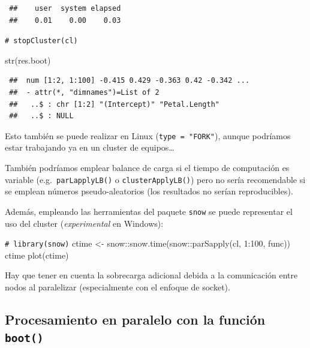 \documentclass[
]{book}
\newenvironment{Shaded}{\begin{snugshade}}{\end{snugshade}}
\newcommand{\CommentTok}[1]{\textcolor[rgb]{0.56,0.35,0.01}{\textit{#1}}}
\newcommand{\DecValTok}[1]{\textcolor[rgb]{0.00,0.00,0.81}{#1}}
\newcommand{\FunctionTok}[1]{\textcolor[rgb]{0.00,0.00,0.00}{#1}}
\newcommand{\NormalTok}[1]{#1}
\newcommand{\OtherTok}[1]{\textcolor[rgb]{0.56,0.35,0.01}{#1}}
\newcommand{\SpecialCharTok}[1]{\textcolor[rgb]{0.00,0.00,0.00}{#1}}
\theoremstyle{break}
\theoremstyle{nonumberplain}
\renewcommand{\CommentTok}[1]{\textcolor[rgb]{0.41,0.41,0.41}{\texttt{#1}}}
\begin{document}
\begin{verbatim}
 ##    user  system elapsed 
 ##    0.01    0.00    0.03
\end{verbatim}

\begin{Shaded}
\begin{Highlighting}[]
\CommentTok{\# stopCluster(cl)}

\FunctionTok{str}\NormalTok{(res.boot)}
\end{Highlighting}
\end{Shaded}

\begin{verbatim}
 ##  num [1:2, 1:100] -0.415 0.429 -0.363 0.42 -0.342 ...
 ##  - attr(*, "dimnames")=List of 2
 ##   ..$ : chr [1:2] "(Intercept)" "Petal.Length"
 ##   ..$ : NULL
\end{verbatim}

Esto también se puede realizar en Linux (\texttt{type\ =\ "FORK"}), aunque podríamos estar trabajando ya en un cluster de equipos\ldots{}

También podríamos emplear balance de carga si el tiempo de computación es variable (e.g.~\texttt{parLapplyLB()} o \texttt{clusterApplyLB()}) pero no sería recomendable si se emplean números pseudo-aleatorios (los resultados no serían reproducibles).

Además, empleando las herramientas del paquete \texttt{snow} se puede representar el uso del cluster (\emph{experimental} en Windows):

\begin{Shaded}
\begin{Highlighting}[]
\CommentTok{\# library(snow)}
\NormalTok{ctime }\OtherTok{\textless{}{-}}\NormalTok{ snow}\SpecialCharTok{::}\FunctionTok{snow.time}\NormalTok{(snow}\SpecialCharTok{::}\FunctionTok{parSapply}\NormalTok{(cl, }\DecValTok{1}\SpecialCharTok{:}\DecValTok{100}\NormalTok{, func))}
\NormalTok{ctime}
\FunctionTok{plot}\NormalTok{(ctime)}
\end{Highlighting}
\end{Shaded}

Hay que tener en cuenta la sobrecarga adicional debida a la comunicación entre nodos al paralelizar (especialmente con el enfoque de socket).

\hypertarget{procesamiento-en-paralelo-con-la-funciuxf3n-boot}{%
\subsection{\texorpdfstring{Procesamiento en paralelo con la función \texttt{boot()}}{Procesamiento en paralelo con la función boot()}}\label{procesamiento-en-paralelo-con-la-funciuxf3n-boot}}
\end{document}
